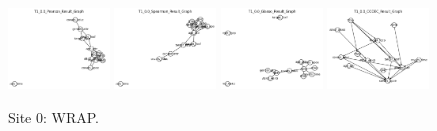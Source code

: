 \begin{figure}
    \includegraphics[width=0.24\textwidth]{chap6/figs/T1_0.0_Pearson_Result_Graph.png}
    \includegraphics[width=0.24\textwidth]{chap6/figs/T1_0.0_Spearman_Result_Graph.png}
    \includegraphics[width=0.24\textwidth]{chap6/figs/T1_0.0_Glasso_Result_Graph.png}
    \includegraphics[width=0.24\textwidth]{chap6/figs/T1_0.0_CODEC_Result_Graph.png}
    \caption{Site 0: WRAP.}
    \label{fig:site0}
\end{figure}

